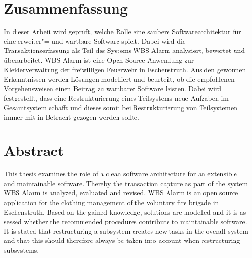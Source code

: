 
\chapter*{Zusammenfassung}
\label{sec:Abstract}

In dieser Arbeit wird geprüft, welche Rolle eine saubere Softwarearchitektur für eine erweiter"= und wartbare Software spielt. Dabei wird die Transaktionserfassung als Teil des Systems WBS Alarm analysiert, bewertet und überarbeitet. WBS Alarm ist eine Open Source Anwendung zur Kleiderverwaltung der freiwilligen Feuerwehr in Eschenstruth. Aus den gewonnen Erkenntnissen werden Lösungen modelliert und beurteilt, ob die empfohlenen Vorgehensweisen einen Beitrag zu wartbarer Software leisten. Dabei wird festgestellt, dass eine Restrukturierung eines Teilsystems neue Aufgaben im Gesamtsystem schafft und dieses somit bei Restrukturierung von Teilsystemen immer mit in Betracht gezogen werden sollte.

{\let\clearpage\relax\chapter*{Abstract}}

\begin{otherlanguage}{british}
This thesis examines the role of a clean software architecture for an extensible and maintainable software. Thereby the transaction capture as part of the system WBS Alarm is analyzed, evaluated and revised. WBS Alarm is an open source application for the clothing management of the voluntary fire brigade in Eschenstruth. Based on the gained knowledge, solutions are modelled and it is assessed whether the recommended procedures contribute to maintainable software. It is stated that restructuring a subsystem creates new tasks in the overall system and that this should therefore always be taken into account when restructuring subsystems.
\end{otherlanguage}